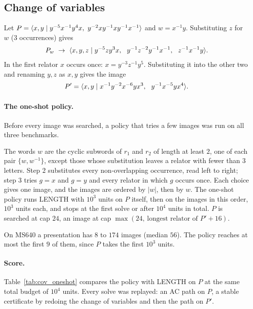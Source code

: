 \subsection{Change of variables}\label{app:cov}

\begin{example}
Let $P=\pres{x,y}{y^{-5}x^{-1}y^{4}x,\ y^{-2}xy^{-1}xy^{-1}x^{-1}}$ and $w=x^{-1}y$. Substituting $z$ for
$w$ ($3$ occurrences) gives
\[
P_w\ \to\ \pres{x,y,z}{y^{-5}zy^{3}x,\ \ y^{-1}z^{-2}y^{-1}x^{-1},\ \ z^{-1}x^{-1}y}.
\]
In the first relator $x$ occurs once: $x=y^{-3}z^{-1}y^{5}$. Substituting it into the other two and renaming
$y,z$ as $x,y$ gives the image
\[
P'=\pres{x,y}{x^{-1}y^{-2}x^{-6}yx^{3},\ \ y^{-1}x^{-5}yx^{4}}.
\]
\end{example}

\paragraph{The one-shot policy.} Before every image was searched, a policy that tries a few images was run on all three
benchmarks.

\begin{definition}\label{def:oneshotpolicy}
The words $w$ are the cyclic subwords of $r_1$ and $r_2$ of length at least $2$, one of each pair $\{w,w^{-1}\}$,
except those whose substitution leaves a relator with fewer than $3$ letters. Step 2 substitutes every
non-overlapping occurrence, read left to right; step 3 tries $g=x$ and $g=y$ and every relator in which $g$ occurs once.
Each choice gives one image, and the images are ordered by $|w|$, then by $w$. The one-shot policy runs LENGTH with
$10^3$ units on $P$ itself, then on the images in this order, $10^3$ units each, and stops at the first solve or after
$10^4$ units in total. $P$ is searched at cap $24$, an image at cap $\max(24,\ \text{longest relator of }P'+16)$.
\end{definition}

On MS640 a presentation has $8$ to $174$ images (median $56$). The policy reaches at most the first $9$ of them, since
$P$ takes the first $10^3$ units.

\paragraph{Score.} Table~\ref{tab:cov_oneshot} compares the policy with LENGTH on $P$ at the same total budget of
$10^4$ units. Every solve was replayed: an AC path on $P$, a stable certificate by redoing the change of variables and
then the path on $P'$.

